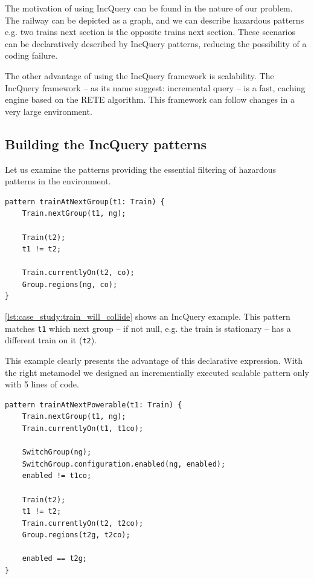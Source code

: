 The motivation of using IncQuery can be found in the nature of our problem. The railway can be depicted as a graph, and we can describe hazardous patterns e.g. two trains next section is the opposite trains next section. These scenarios can be declaratively described by IncQuery patterns, reducing the possibility of a coding failure. 

The other advantage of using the IncQuery framework is scalability. The IncQuery framework -- as its name suggest: incremental query -- is a fast, caching engine based on the RETE algorithm. This framework can follow changes in a very large environment. 

\subsection{Building the IncQuery patterns}
\label{sec:case_study:pattern_building}

Let us examine the patterns providing the essential filtering of hazardous patterns in the environment.
\\[1ex]

\begin{lstlisting}[caption={Collision detection},label=lst:case_study:train_will_collide]
pattern trainAtNextGroup(t1: Train) {
	Train.nextGroup(t1, ng);
	
	Train(t2);
	t1 != t2;
	
	Train.currentlyOn(t2, co);
	Group.regions(ng, co);
}
\end{lstlisting}

\cref{lst:case_study:train_will_collide} shows an IncQuery example. This pattern matches \verb+t1+ which next group -- if not null, e.g. the train is stationary -- has a different train on it (\verb+t2+).

This example clearly presents the advantage of this declarative expression. With the right metamodel we designed an incrementially executed scalable pattern only with 5 lines of code.
\\[1ex]

\begin{lstlisting}[caption={Collision detection},label=lst:case_study:train_at_next_powerable]
pattern trainAtNextPowerable(t1: Train) {
	Train.nextGroup(t1, ng);
	Train.currentlyOn(t1, t1co);
	
	SwitchGroup(ng);
	SwitchGroup.configuration.enabled(ng, enabled);
	enabled != t1co;
	
	Train(t2);
	t1 != t2;
	Train.currentlyOn(t2, t2co);
	Group.regions(t2g, t2co);
	
	enabled == t2g;
}
\end{lstlisting}

